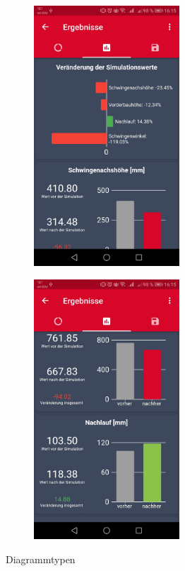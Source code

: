 		
	\begin{figure}[H]
	\begin{subfigure}[b]{0.5\textwidth}
		\centering
		\includegraphics[width=0.6\textwidth]{../include/images/funktionalitaet/diagramm_1}
	\end{subfigure}
	\hfill
	\begin{subfigure}[b]{0.5\textwidth}
	\centering
		\includegraphics[width=0.6\textwidth]{../include/images/funktionalitaet/diagramm_2}
	\end{subfigure}		
	
	\caption{Diagrammtypen}
\end{figure}
		
